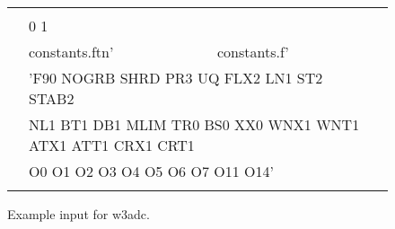 \setlength{\unitlength}{0.1mm}

\begin{figure}

\begin{center} {\code \begin{tabular}{|cllc|} \hline
 & & &  \\
 & \multicolumn{2}{l}{0 1}        & \\ 
 & constants.ftn' & constants.f'  & \\
 & \multicolumn{2}{l}{'F90 NOGRB SHRD PR3 UQ FLX2 LN1 ST2 STAB2}& \\
 & \multicolumn{2}{l}{\strut\hspace{5mm} NL1 BT1 DB1 MLIM TR0 BS0 XX0 WNX1 WNT1 ATX1 ATT1 CRX1 CRT1 }& \\
 & \multicolumn{2}{l}{\strut\hspace{5mm} O0 O1 O2 O3 O4 O5 O6 O7 O11 O14'}& \\
 &               &             & \\ \hline
\end{tabular} } \end{center} 
\caption{Example input for {\F w3adc}.} \label{fig:w3adc}

\botline
\end{figure}
